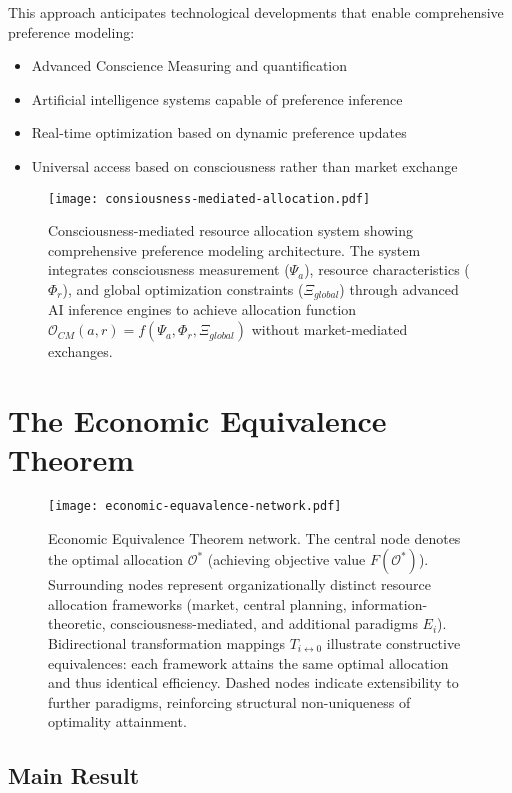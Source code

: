 \documentclass[12pt,a4paper]{article}
\begin{document}
This approach anticipates technological developments that enable comprehensive preference modeling:
\begin{itemize}
\item Advanced Conscience Measuring and quantification
\item Artificial intelligence systems capable of preference inference
\item Real-time optimization based on dynamic preference updates
\item Universal access based on consciousness rather than market exchange
\end{itemize}

\begin{figure}[H]
\centering
\texttt{[image: consiousness-mediated-allocation.pdf]}
\caption{Consciousness-mediated resource allocation system showing comprehensive preference modeling architecture. The system integrates consciousness measurement ($\Psi_a$), resource characteristics ($\Phi_r$), and global optimization constraints ($\Xi_{global}$) through advanced AI inference engines to achieve allocation function $\mathcal{O}_{CM}(a,r) = f(\Psi_a, \Phi_r, \Xi_{global})$ without market-mediated exchanges.}
\label{fig:consciousness-mediated-allocation}
\end{figure}


\section{The Economic Equivalence Theorem}

\begin{figure}[H]
\centering
\texttt{[image: economic-equavalence-network.pdf]}
\caption{Economic Equivalence Theorem network. The central node denotes the optimal allocation $\mathcal{O}^*$ (achieving objective value $F(\mathcal{O}^*)$). Surrounding nodes represent organizationally distinct resource allocation frameworks (market, central planning, information-theoretic, consciousness-mediated, and additional paradigms $E_i$). Bidirectional transformation mappings $T_{i\leftrightarrow 0}$ illustrate constructive equivalences: each framework attains the same optimal allocation and thus identical efficiency. Dashed nodes indicate extensibility to further paradigms, reinforcing structural non-uniqueness of optimality attainment.}
\label{fig:economic-equavalence-network}
\end{figure}

\subsection{Main Result}
\end{document}
